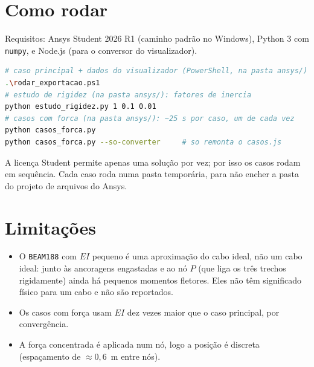 \documentclass[11pt,a4paper]{article}
\begin{document}
\section{Como rodar}
Requisitos: Ansys Student 2026 R1 (caminho padrão no Windows), Python 3 com \texttt{numpy}, e
Node.js (para o conversor do visualizador).
\begin{lstlisting}[language=bash]
# caso principal + dados do visualizador (PowerShell, na pasta ansys/)
.\rodar_exportacao.ps1
# estudo de rigidez (na pasta ansys/): fatores de inercia
python estudo_rigidez.py 1 0.1 0.01
# casos com forca (na pasta ansys/): ~25 s por caso, um de cada vez
python casos_forca.py
python casos_forca.py --so-converter     # so remonta o casos.js
\end{lstlisting}
A licença Student permite apenas uma solução por vez; por isso os casos rodam em sequência. Cada caso
roda numa pasta temporária, para não encher a pasta do projeto de arquivos do Ansys.

\section{Limitações}
\begin{itemize}[itemsep=2pt]
  \item O \texttt{BEAM188} com $EI$ pequeno é uma aproximação do cabo ideal, não um cabo ideal: junto
        às ancoragens engastadas e ao nó $P$ (que liga os três trechos rigidamente) ainda há
        pequenos momentos fletores. Eles não têm significado físico para um cabo e não são
        reportados.
  \item Os casos com força usam $EI$ dez vezes maior que o caso principal, por convergência.
  \item A força concentrada é aplicada num nó, logo a posição é discreta (espaçamento de
        $\approx 0{,}6$~m entre nós).
\end{itemize}
\end{document}
